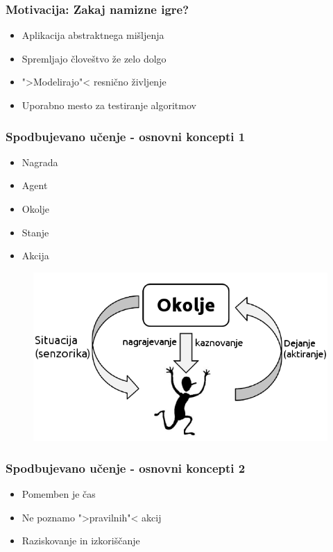 \documentclass{beamer}    %
\begin{document}
\begin{frame}
    \frametitle{Motivacija: Zakaj namizne igre?}
    \begin{itemize}
        \item Aplikacija abstraktnega mišljenja
        \pause
        \item Spremljajo človeštvo že zelo dolgo
        \pause
        \item ">Modelirajo"< resnično življenje
        \pause
        \item Uporabno mesto za testiranje algoritmov
    \end{itemize}
\end{frame}


\begin{frame}
    \frametitle{Spodbujevano učenje - osnovni koncepti 1}
    \begin{multicols}{2}
    \begin{itemize}
        \item Nagrada
        \item Agent
        \item Okolje
        \item Stanje
        \item Akcija
    \end{itemize}
    \end{multicols}

    \begin{figure}
        \includegraphics[scale=0.5]{slike/RLloop.png}
    \end{figure}
\end{frame}


\begin{frame}
    \frametitle{Spodbujevano učenje - osnovni koncepti 2}
    \begin{itemize}
        \item Pomemben je čas
        \item Ne poznamo ">pravilnih"< akcij
        \item Raziskovanje in izkoriščanje
    \end{itemize}
\end{frame}
\end{document}
